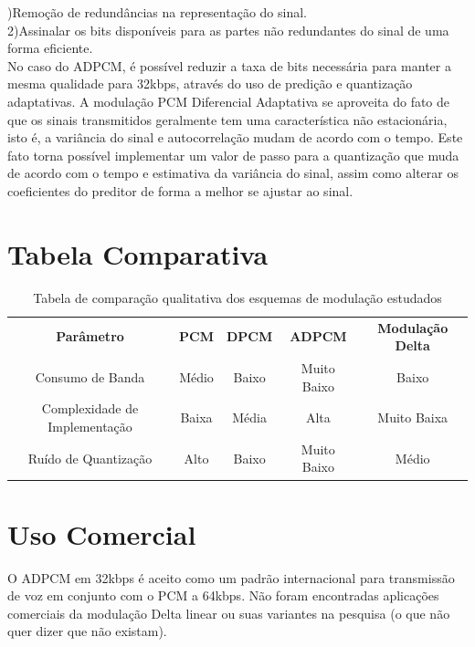 )Remoção de redundâncias na representação do sinal.\\
2)Assinalar os bits disponíveis para as partes não redundantes do sinal de uma forma eficiente.\\

No caso do ADPCM, é possível reduzir a taxa de bits necessária para manter a mesma qualidade para 32kbps, através do uso de predição e quantização adaptativas. A modulação PCM Diferencial Adaptativa se aproveita do fato de que os sinais transmitidos geralmente tem uma característica não estacionária, isto é, a variância do sinal e autocorrelação mudam de acordo com o tempo. Este fato torna possível implementar um valor de passo para a quantização que muda de acordo com o tempo e estimativa da variância do sinal, assim como alterar os coeficientes do preditor de forma a melhor se ajustar ao sinal. 
\section{Tabela Comparativa}

\begin{table}[htbp]
  \centering
    \caption{Tabela de comparação qualitativa dos esquemas de modulação estudados}
    \begin{tabular}{ccccc}
    \textbf{Parâmetro} & \textbf{PCM} & \textbf{DPCM} & \textbf{ADPCM} & \textbf{Modulação Delta}\\
    Consumo de Banda     & Médio &  Baixo & Muito Baixo & Baixo \\
    Complexidade de Implementação     & Baixa & Média   & Alta & Muito Baixa  \\
    Ruído de Quantização     & Alto & Baixo   & Muito Baixo & Médio\\     
    \end{tabular}%

\end{table}

\section{Uso Comercial}

O ADPCM em 32kbps é aceito como um padrão internacional para transmissão de voz em conjunto com o PCM a 64kbps. Não foram encontradas aplicações comerciais da modulação Delta linear ou suas variantes na pesquisa (o que não quer dizer que não existam). 
